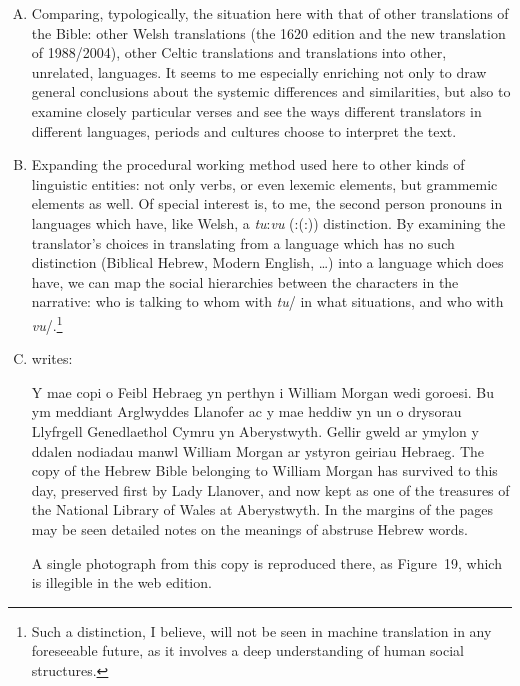 \begin{enumerate}[A.]
	\item Comparing, typologically, the situation here with that of other translations of the Bible: other Welsh translations (the 1620 edition and the new translation of 1988/2004), other Celtic translations and translations into other, unrelated, languages. It seems to me especially enriching not only to draw general conclusions about the systemic differences and similarities, but also to examine closely particular verses and see the ways different translators in different languages, periods and cultures choose to interpret the text.


	\item Expanding the procedural working method used here to other kinds of linguistic entities: not only verbs, or even lexemic elements, but grammemic elements as well. Of special interest is, to me, the second person pronouns in languages which have, like Welsh, a \mbox{\textit{tu}:\textit{vu}} (\mbox{:(:)}) distinction. By examining the translator’s choices in translating from a language which has no such distinction (Biblical Hebrew, Modern English, …) into a language which does have, we can map the social hierarchies between the characters in the narrative: who is talking to whom with \textit{tu}/ in what situations, and who with \textit{vu}/.\footnote{Such a distinction, I believe, will not be seen in machine translation in any foreseeable future, as it involves a deep understanding of {human} social structures.}


	\item \cite{morgan.p:1988:beibl} writes:
		\begin{changemargin}{1cm}{0cm}
			\begin{bilingquote}
				\transline
				{{Y mae copi o Feibl Hebraeg yn perthyn i William Morgan wedi goroesi. Bu ym meddiant Arglwyddes Llanofer ac y mae heddiw yn un o drysorau Llyfrgell Genedlaethol Cymru yn Aberystwyth. Gellir gweld ar ymylon y ddalen nodiadau manwl William Morgan ar ystyron geiriau Hebraeg.}}
				{The copy of the Hebrew Bible belonging to William Morgan has survived to this day, preserved first by Lady Llanover, and now kept as one of the treasures of the National Library of Wales at Aberystwyth. In the margins of the pages may be seen detailed notes on the meanings of abstruse Hebrew words.}
			\end{bilingquote}
		\end{changemargin}
		\vspace{-0.5cm}
		A single photograph from this copy is reproduced there, as Figure~19, which is illegible in the web edition.


\end{enumerate}
